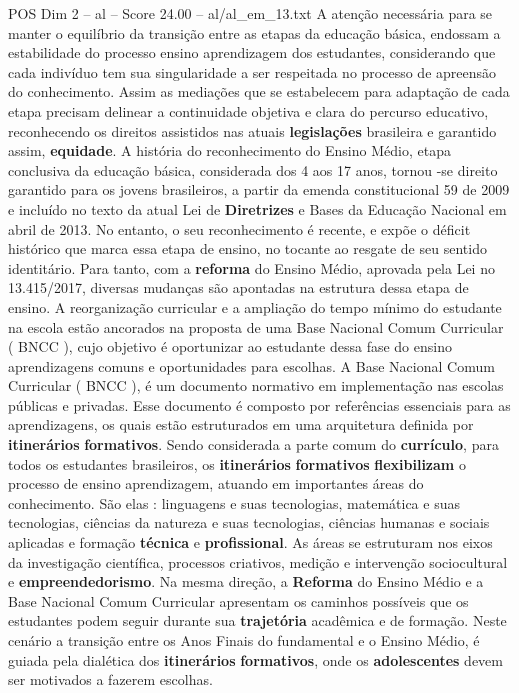 \begin{textsample}{POS Dim 2 – al – Score 24.00 – al/al\_em\_13.txt}
A atenção necessária para se manter o equilíbrio da transição entre as etapas da educação básica, endossam a estabilidade do processo ensino aprendizagem dos estudantes, considerando que cada indivíduo tem sua singularidade a ser respeitada no processo de apreensão do conhecimento.
Assim as mediações que se estabelecem para adaptação de cada etapa precisam delinear a continuidade objetiva e clara do percurso educativo, reconhecendo os direitos assistidos nas atuais \textbf{legislações} brasileira e garantido assim, \textbf{equidade}.
A história do reconhecimento do Ensino Médio, etapa conclusiva da educação básica, considerada dos 4 aos 17 anos, tornou -se direito garantido para os jovens brasileiros, a partir da emenda constitucional 59 de 2009 e incluído no texto da atual Lei de \textbf{Diretrizes} e Bases da Educação Nacional em abril de 2013.
No entanto, o seu reconhecimento é recente, e expõe o déficit histórico que marca essa etapa de ensino, no tocante ao resgate de seu sentido identitário.
Para tanto, com a \textbf{reforma} do Ensino Médio, aprovada pela Lei no 13.415/2017, diversas mudanças são apontadas na estrutura dessa etapa de ensino.
A reorganização curricular e a ampliação do tempo mínimo do estudante na escola estão ancorados na proposta de uma Base Nacional Comum Curricular ( BNCC ), cujo objetivo é oportunizar ao estudante dessa fase do ensino aprendizagens comuns e oportunidades para escolhas.
A Base Nacional Comum Curricular ( BNCC ), é um documento normativo em implementação nas escolas públicas e privadas.
Esse documento é composto por referências essenciais para as aprendizagens, os quais estão estruturados em uma arquitetura definida por \textbf{itinerários} \textbf{formativos}.
Sendo considerada a parte comum do \textbf{currículo}, para todos os estudantes brasileiros, os \textbf{itinerários} \textbf{formativos} \textbf{flexibilizam} o processo de ensino aprendizagem, atuando em importantes áreas do conhecimento.
São elas : linguagens e suas tecnologias, matemática e suas tecnologias, ciências da natureza e suas tecnologias, ciências humanas e sociais aplicadas e formação \textbf{técnica} e \textbf{profissional}.
As áreas se estruturam nos eixos da investigação científica, processos criativos, medição e intervenção sociocultural e \textbf{empreendedorismo}.
Na mesma direção, a \textbf{Reforma} do Ensino Médio e a Base Nacional Comum Curricular apresentam os caminhos possíveis que os estudantes podem seguir durante sua \textbf{trajetória} acadêmica e de formação.
Neste cenário a transição entre os Anos Finais do fundamental e o Ensino Médio, é guiada pela dialética dos \textbf{itinerários} \textbf{formativos}, onde os \textbf{adolescentes} devem ser motivados a fazerem escolhas.

\end{textsample}
